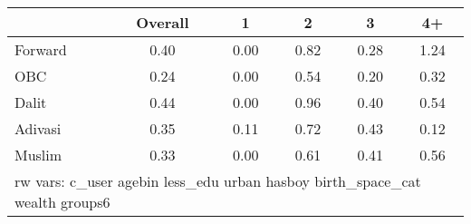 \begin{tabular}{l*{5}{c}}
\toprule
            &\multicolumn{1}{c}{Overall}&\multicolumn{1}{c}{1}&\multicolumn{1}{c}{2}&\multicolumn{1}{c}{3}&\multicolumn{1}{c}{4+}\\
\midrule
\midrule
Forward     &        0.40&        0.00&        0.82&        0.28&        1.24\\
OBC         &        0.24&        0.00&        0.54&        0.20&        0.32\\
Dalit       &        0.44&        0.00&        0.96&        0.40&        0.54\\
Adivasi     &        0.35&        0.11&        0.72&        0.43&        0.12\\
Muslim      &        0.33&        0.00&        0.61&        0.41&        0.56\\
\bottomrule
\multicolumn{6}{l}{\footnotesize rw vars: c\_user agebin less\_edu urban hasboy birth\_space\_cat wealth groups6}\\
\end{tabular}
